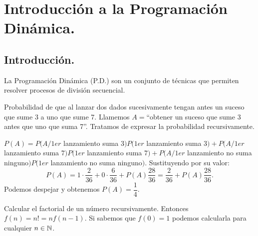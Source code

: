 \documentclass[MIOP.tex]{subfiles}
\begin{document}
\chapter{Introducción a la Programación\\ Dinámica.}
\section{Introducción.}
La Programación Dinámica (P.D.) son un conjunto de técnicas que permiten resolver procesos de división secuencial.
\begin{ej}
Probabilidad de que al lanzar dos dados sucesivamente tengan antes un suceso que sume 3 a uno que sume 7. Llamemos $A=$``obtener un suceso que sume 3 antes que uno que suma 7''. Tratamos de expresar la probabilidad recursivamente. 

$P(A)=P(A/1er$ lanzamiento suma $3)P(1er$ lanzamiento suma 3$)+P(A/1er$ lanzamiento suma $7)P(1er$ lanzamiento suma $7)+P(A/1er$ lanzamiento no suma ninguno$)P(1er$ lanzamiento no suma ninguno$)$. Sustituyendo por su valor:
$$P(A)=1\cdot\frac{2}{36}+0\cdot\frac{6}{36}+P(A)\frac{28}{36}=\frac{2}{36}+P(A)\frac{28}{36}.$$
Podemos despejar y obtenemos $P(A)=\dfrac{1}{4}$. 
\end{ej}

\begin{ej}
Calcular el factorial de un número recursivamente. Entonces $f(n)=n!=nf(n-1)$. Si sabemos que $f(0)=1$ podemos calcularla para cualquier $n\in\mathbb{N}$.
\end{ej}
\end{document}
